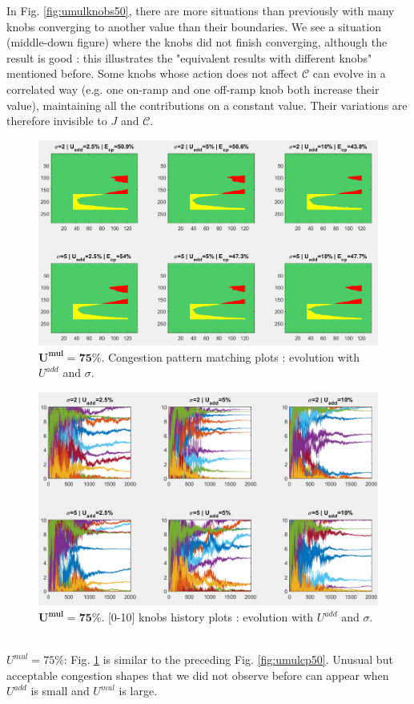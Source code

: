 In Fig. \ref{fig:umulknobs50}, there are more situations than previously with many knobs converging to another value than their  boundaries. We see a situation (middle-down figure) where the knobs did not finish converging, although the result is good : this illustrates the "equivalent results with different knobs" mentioned before. Some knobs whose action does not affect $\mathscr{C}$ can evolve in a correlated way (e.g. one on-ramp and one off-ramp knob both increase their value), maintaining all the contributions on a constant value. Their variations are therefore invisible to $J$ and $\mathscr{C}$.\\
\begin{figure}[!h]
	\label{fig:umulcp75}
	\caption{$\mathbf{U^{mul}=75\%}$. Congestion pattern matching plots : evolution with $U^{add}$ and $\sigma$.}
	\includegraphics[width=7in]{figures/results_figures/Umul/cp_Umul_75_lambda_11.png}
\end{figure}
\begin{figure}[!h]
	\label{fig:umulknobs75}
	\caption{$\mathbf{U^{mul}=75\%}$. [0-10] knobs history plots : evolution with $U^{add}$ and $\sigma$.}
	\includegraphics[width=7in]{figures/results_figures/Umul/knobs_Umul_75_lambda_11.png}
\end{figure}	
\\
\emph{$U^{mul}=75\% $}: Fig. \ref{fig:umulcp75} is similar to the preceding Fig. \ref{fig:umulcp50}. Unusual but acceptable congestion shapes that we did not observe before can appear when $U^{add}$ is small and $U^{mul}$  is large. 

